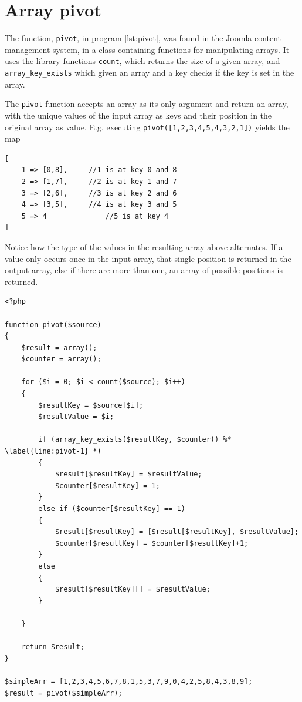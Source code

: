 \section{Array pivot}
The function, \texttt{pivot}, in program \ref{lst:pivot}, was found in the Joomla content management system, in a class containing functions for manipulating arrays. It uses the library functions \texttt{count}, which returns the size of a given array, and \texttt{array\_key\_exists} which given an array and a key checks if the key is set in the array. 

The \texttt{pivot} function accepts an array as its only argument and return an array, with the unique values of the input array as keys and their position in the original array as value. E.g. executing \texttt{pivot([1,2,3,4,5,4,3,2,1])} yields the map
\begin{lstlisting}[style=nonumbers]
[
	1 => [0,8], 	//1 is at key 0 and 8
	2 => [1,7], 	//2 is at key 1 and 7
	3 => [2,6], 	//3 is at key 2 and 6
	4 => [3,5], 	//4 is at key 3 and 5
	5 => 4  			//5 is at key 4
]
\end{lstlisting}
Notice how the type of the values in the resulting array above alternates. If a value only occurs once in the input array, that single position is returned in the output array, else  if there are more than one, an array of possible positions is returned.
\begin{program}
\begin{lstlisting}
<?php

function pivot($source)
{
    $result = array();
    $counter = array();

    for ($i = 0; $i < count($source); $i++)
    {
        $resultKey = $source[$i];
        $resultValue = $i;

        if (array_key_exists($resultKey, $counter)) %* \label{line:pivot-1} *)
        {
            $result[$resultKey] = $resultValue;
            $counter[$resultKey] = 1;
        }
        else if ($counter[$resultKey] == 1)
        {
            $result[$resultKey] = [$result[$resultKey], $resultValue];
            $counter[$resultKey] = $counter[$resultKey]+1;
        }
        else
        {
            $result[$resultKey][] = $resultValue;
        }

    }

    return $result;
}

$simpleArr = [1,2,3,4,5,6,7,8,1,5,3,7,9,0,4,2,5,8,4,3,8,9];
$result = pivot($simpleArr);
\end{lstlisting}
\caption{Pivot example}
\label{lst:pivot}
\end{program}

